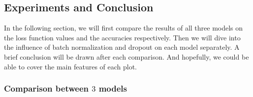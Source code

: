 \documentclass[12pt,letterpaper]{article}
\begin{document}
\subsection{Experiments and Conclusion}

In the following section, we will first compare the results of all three models on the loss function values and the accuracies respectively. Then we will dive into the influence of batch normalization and dropout on each model separately. A brief conclusion will be drawn after each comparison. And hopefully, we could be able to cover the main features of each plot.

\subsubsection{Comparison between $3$ models}
\end{document}
